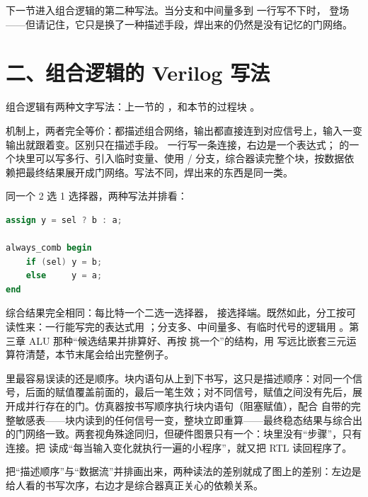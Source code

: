 下一节进入组合逻辑的第二种写法。当分支和中间量多到  一行写不下时， 登场——但请记住，它只是换了一种描述手段，焊出来的仍然是没有记忆的门网络。

\section{二、组合逻辑的 Verilog 写法}

组合逻辑有两种文字写法：上一节的 ，和本节的过程块 。

机制上，两者完全等价：都描述组合网络，输出都直接连到对应信号上，输入一变输出就跟着变。区别只在描述手段。 一行写一条连接，右边是一个表达式； 的一个块里可以写多行、引入临时变量、使用 / 分支，综合器读完整个块，按数据依赖把最终结果展开成门网络。写法不同，焊出来的东西是同一类。

同一个 2 选 1 选择器，两种写法并排看：

\begin{lstlisting}[language=Verilog]
assign y = sel ? b : a;

always_comb begin
    if (sel) y = b;
    else     y = a;
end
\end{lstlisting}

综合结果完全相同：每比特一个二选一选择器， 接选择端。既然如此，分工按可读性来：一行能写完的表达式用 ；分支多、中间量多、有临时代号的逻辑用 。第三章 ALU 那种“候选结果并排算好、再按  挑一个”的结构，用  写远比嵌套三元运算符清楚，本节末尾会给出完整例子。

 里最容易误读的还是顺序。块内语句从上到下书写，这只是描述顺序：对同一个信号，后面的赋值覆盖前面的，最后一笔生效；对不同信号，赋值之间没有先后，展开成并行存在的门。仿真器按书写顺序执行块内语句（阻塞赋值），配合  自带的完整敏感表——块内读到的任何信号一变，整块立即重算——最终稳态结果与综合出的门网络一致。两套视角殊途同归，但硬件图景只有一个：块里没有“步骤”，只有连接。把  读成“每当输入变化就执行一遍的小程序”，就又把 RTL 读回程序了。

把“描述顺序”与“数据流”并排画出来，两种读法的差别就成了图上的差别：左边是给人看的书写次序，右边才是综合器真正关心的依赖关系。

